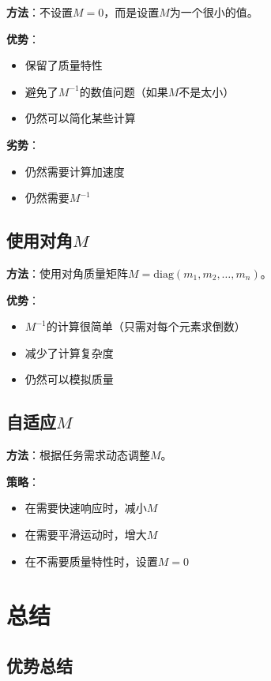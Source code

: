 \documentclass[12pt,a4paper]{article}
\begin{document}
\textbf{方法}：不设置$M = 0$，而是设置$M$为一个很小的值。

\textbf{优势}：
\begin{itemize}
\item 保留了质量特性
\item 避免了$M^{-1}$的数值问题（如果$M$不是太小）
\item 仍然可以简化某些计算
\end{itemize}

\textbf{劣势}：
\begin{itemize}
\item 仍然需要计算加速度
\item 仍然需要$M^{-1}$
\end{itemize}

\subsection{使用对角$M$}

\textbf{方法}：使用对角质量矩阵$M = \text{diag}(m_1, m_2, \ldots, m_n)$。

\textbf{优势}：
\begin{itemize}
\item $M^{-1}$的计算很简单（只需对每个元素求倒数）
\item 减少了计算复杂度
\item 仍然可以模拟质量
\end{itemize}

\subsection{自适应$M$}

\textbf{方法}：根据任务需求动态调整$M$。

\textbf{策略}：
\begin{itemize}
\item 在需要快速响应时，减小$M$
\item 在需要平滑运动时，增大$M$
\item 在不需要质量特性时，设置$M = 0$
\end{itemize}

\section{总结}

\subsection{优势总结}
\end{document}
